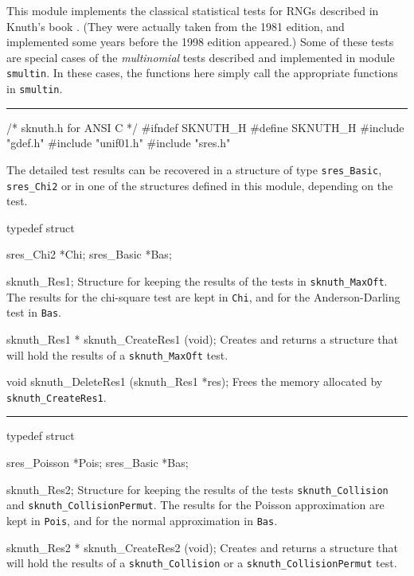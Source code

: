
This module implements the classical statistical tests for RNGs
described in Knuth's book \cite{rKNU81a}.  
(They were actually taken from the 1981 edition, and implemented
some years before the 1998 edition \cite{rKNU98a} appeared.)
Some of these tests are special cases of the {\em multinomial\/}
tests described and implemented in module {\tt smultin}.
In these cases, the functions here simply call the appropriate 
functions in {\tt smultin}.
\resdef

\bigskip\hrule

\code\hide
/* sknuth.h  for ANSI C */
#ifndef SKNUTH_H
#define SKNUTH_H
\endhide
#include "gdef.h"
#include "unif01.h"
#include "sres.h"
\endcode


\ifdetailed  %


The detailed test results can be recovered in a structure of type
{\tt sres\_Basic}, {\tt sres\_Chi2} or in one of the structures
defined in this module, depending on the test.

\code

typedef struct {

   sres_Chi2 *Chi;
   sres_Basic *Bas;

} sknuth_Res1;
\endcode
 \tab
  Structure for keeping the results of the tests in {\tt sknuth\_MaxOft}.
  The results for the chi-square test are kept in
  {\tt Chi}, and for the Anderson-Darling test in  {\tt Bas}.
 \endtab
\code


sknuth_Res1 * sknuth_CreateRes1 (void);
\endcode
 \tab 
  Creates and returns a structure that will hold the results
  of a  {\tt sknuth\_MaxOft} test. 
 \endtab
\code


void sknuth_DeleteRes1 (sknuth_Res1 *res);
\endcode
 \tab 
  Frees the memory allocated by {\tt sknuth\_CreateRes1}.
 \endtab

\bigskip\hrule\bigskip

\code
typedef struct {

   sres_Poisson *Pois;
   sres_Basic *Bas;

} sknuth_Res2;
\endcode
 \tab
  Structure for keeping the results of the tests {\tt sknuth\_Collision}
  and {\tt sknuth\_CollisionPermut}.
  The results for the Poisson approximation are kept in
  {\tt Pois}, and for the normal approximation in  {\tt Bas}.
 \endtab
\code


sknuth_Res2 * sknuth_CreateRes2 (void);
\endcode
 \tab 
  Creates and returns a structure that will hold the results
  of a  {\tt sknuth\_Collision} or a {\tt sknuth\_CollisionPermut} test. 
 \endtab
\code


